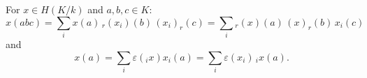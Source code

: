 For $x \in H(K/k)$ and $a, b, c \in K$:
$$x(abc) = \sum_i x(a) \, {}_r(x_i)(b) \, (x_i)_r(c) = \sum_i {}_r(x)(a) \, (x)_r(b) \, x_i(c)$$
and
$$x(a) = \sum_i \varepsilon({}_i x) x_i(a) = \sum_i \varepsilon(x_i) \, {}_i x(a).$$
